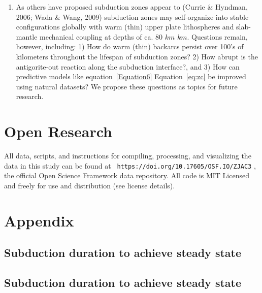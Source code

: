 \documentclass[draft,linenumbers]{agujournal2018} %
\providecommand{\DIFaddtex}[1]{{\protect\color{blue} \sf #1}} %
\providecommand{\DIFdeltex}[1]{{\protect\color{red} \scriptsize #1}} %
\providecommand{\DIFaddbegin}{} %
\providecommand{\DIFaddend}{} %
\providecommand{\DIFdelbegin}{} %
\providecommand{\DIFdelend}{} %
\providecommand{\DIFadd}[1]{\texorpdfstring{\DIFaddtex{#1}}{#1}} %
\providecommand{\DIFdel}[1]{\texorpdfstring{\DIFdeltex{#1}}{}} %
\newcommand{\DIFscaledelfig}{0.3}
\newlength{\DIFdelgraphicswidth} %
\newlength{\DIFdelgraphicsheight} %
\newcommand{\DIFaddincludegraphics}[2][]{{\color{blue}\fbox{\DIFOincludegraphics[#1]{#2}}}} %
\newcommand{\DIFdelincludegraphics}[2][]{%
\sbox{\DIFdelgraphicsbox}{\DIFOincludegraphics[#1]{#2}}%
\settoboxwidth{\DIFdelgraphicswidth}{\DIFdelgraphicsbox} %
\settoboxtotalheight{\DIFdelgraphicsheight}{\DIFdelgraphicsbox} %
\scalebox{\DIFscaledelfig}{%
\parbox[b]{\DIFdelgraphicswidth}{\usebox{\DIFdelgraphicsbox}\\[-\baselineskip] \rule{\DIFdelgraphicswidth}{0em}}\llap{\resizebox{\DIFdelgraphicswidth}{\DIFdelgraphicsheight}{%
\setlength{\unitlength}{\DIFdelgraphicswidth}%
\begin{picture}(1,1)%
\thicklines\linethickness{2pt} %
{\color[rgb]{1,0,0}\put(0,0){\framebox(1,1){}}}%
{\color[rgb]{1,0,0}\put(0,0){\line( 1,1){1}}}%
{\color[rgb]{1,0,0}\put(0,1){\line(1,-1){1}}}%
\end{picture}%
}\hspace*{3pt}}} %
} %
\DeclareRobustCommand{\DIFaddbegin}{\DIFOaddbegin \let\includegraphics\DIFaddincludegraphics} %
\DeclareRobustCommand{\DIFaddend}{\DIFOaddend \let\includegraphics\DIFOincludegraphics} %
\DeclareRobustCommand{\DIFdelbegin}{\DIFOdelbegin \let\includegraphics\DIFdelincludegraphics} %
\DeclareRobustCommand{\DIFdelend}{\DIFOaddend \let\includegraphics\DIFOincludegraphics} %
\begin{document}
\begin{enumerate}
\DIFdelend \item
  As others have proposed \DIFdelbegin %
\DIFdel{subduction zones appear to }\DIFdelend \DIFaddbegin \DIFadd{(Currie \& Hyndman, 2006; Wada \& Wang, 2009)
  subduction zones may }\DIFaddend self-organize into stable configurations globally
  with warm (thin) upper plate lithospheres and slab-mantle mechanical
  coupling at depths of ca. 80 \DIFdelbegin \DIFdel{$km$}\DIFdelend \DIFaddbegin \DIFadd{\(km\)}\DIFaddend . Questions remain, however,
  including: 1) How do warm (thin) backarcs persist over 100's of
  kilometers throughout the lifespan of subduction zones? 2) How abrupt
  is the antigorite-out reaction along the subduction interface?, and 3)
  How can predictive models like \DIFdelbegin \DIFdel{equation~\ref{Equation6} }\DIFdelend \DIFaddbegin \DIFadd{Equation~\ref{eq:zc} }\DIFaddend be improved using
  natural datasets? We propose these questions as topics for future
  research.
\DIFdelbegin %

\DIFdelend \end{enumerate}

\DIFaddbegin \section{\DIFadd{Open Research}}

\DIFadd{All data, scripts, and instructions for compiling, processing, and
visualizing the data in this study can be found at
}\texttt{\DIFadd{https://doi.org/10.17605/OSF.IO/ZJAC3}}\DIFadd{, the official Open
Science Framework data repository. All code is MIT Licensed and freely
for use and distribution (see license details).
}

\clearpage

\DIFaddend \appendix
\section{\DIFaddbegin \DIFadd{Appendix}\DIFaddend }
\DIFdelbegin \subsection*{\DIFdel{Subduction duration to achieve steady state}}
\DIFdelend \DIFaddbegin

\subsection{\DIFadd{Subduction duration to achieve steady state}}
\end{document}
